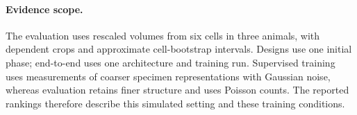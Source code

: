 \paragraph{Evidence scope.}
The evaluation uses rescaled volumes from six cells in three animals, with dependent crops and approximate cell-bootstrap intervals. Designs use one initial phase; end-to-end uses one architecture and training run. Supervised training uses measurements of coarser specimen representations with Gaussian noise, whereas evaluation retains finer structure and uses Poisson counts. The reported rankings therefore describe this simulated setting and these training conditions.
